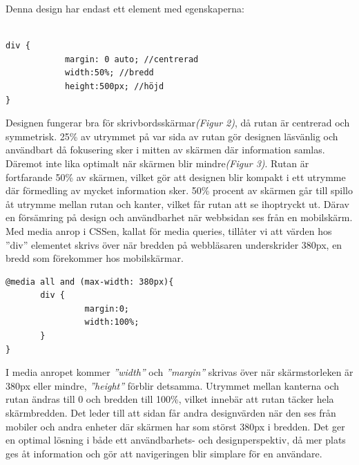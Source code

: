 \documentclass[11pt]{article}
\begin{document}
\vspace{1cm}
Denna design har endast ett element med egenskaperna:

\vspace{0.3cm}
\begin{verbatim}

div {	
	        margin: 0 auto; //centrerad
	        width:50%; //bredd
	        height:500px; //höjd
}
\end{verbatim}
\vspace{0.3cm}
Designen fungerar bra för skrivbordsskärmar\textit{(Figur 2)}, då rutan är centrerad och symmetrisk. 25\% av utrymmet på var sida av rutan gör designen läsvänlig och användbart då fokusering sker i mitten av skärmen där information samlas. Däremot inte lika optimalt när skärmen blir mindre\textit{(Figur 3)}. Rutan är fortfarande 50\% av skärmen, vilket gör att  designen blir kompakt i ett utrymme där förmedling av mycket information sker. 50\% procent av skärmen går till spillo åt utrymme mellan rutan och kanter, vilket får rutan att se ihoptryckt ut. Därav en försämring på design och användbarhet när webbsidan ses från en mobilskärm.
\newpage
Med media anrop i CSSen, kallat för media queries, tillåter vi att värden hos ”div” elementet skrivs över när bredden på webbläsaren underskrider 380px, en bredd som förekommer hos mobilskärmar.

\vspace{0.5cm}
\begin{verbatim}
@media all and (max-width: 380px){
       div {
                margin:0;
                width:100%;
       }
}
\end{verbatim}
\vspace{0.5cm}

I media anropet kommer \textit{”width”} och \textit{”margin”} skrivas över när skärmstorleken är 380px eller mindre, \textit{”height”} förblir detsamma. Utrymmet mellan kanterna och rutan ändras till 0 och bredden till 100\%, vilket innebär att rutan täcker hela skärmbredden. Det leder till att sidan får andra designvärden när den ses från mobiler och andra enheter där skärmen har som störst 380px i bredden. Det ger en optimal lösning i både ett användbarhets- och designperspektiv, då mer plats ges åt information och gör att navigeringen blir simplare för en användare.
\end{document}
